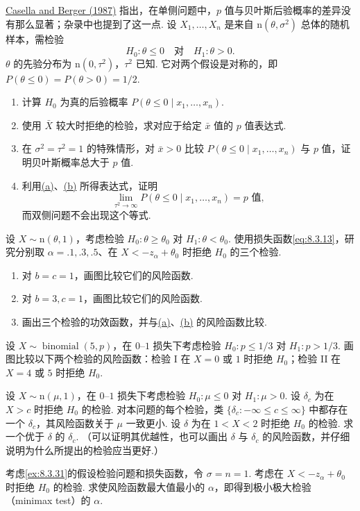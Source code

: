 \begin{exercise}\label{exercise:8.54}
\hyperref[bib:source66]{Casella and Berger (1987)} 指出，在单侧问题中，$p$ 值与贝叶斯后验概率的差异没有那么显著；杂录中也提到了这一点. 设 $X_1,\ldots,X_n$ 是来自 $\mathrm n(\theta,\sigma^2)$ 总体的随机样本，需检验
$$H_0:\theta\le0\quad\text{对}\quad H_1:\theta>0.$$
$\theta$ 的先验分布为 $\mathrm n(0,\tau^2)$，$\tau^2$ 已知. 它对两个假设是对称的，即 $P(\theta\le0)=P(\theta>0)=1/2$.
\begin{enumerate}
\item{}\label{itm:exercise:8.54:a} 计算 $H_0$ 为真的后验概率 $P(\theta\le0\mid x_1,\ldots,x_n)$.
\item{}\label{itm:exercise:8.54:b} 使用 $\bar X$ 较大时拒绝的检验，求对应于给定 $\bar x$ 值的 $p$ 值表达式.
\item 在 $\sigma^2=\tau^2=1$ 的特殊情形，对 $\bar x>0$ 比较 $P(\theta\le0\mid x_1,\ldots,x_n)$ 与 $p$ 值，证明贝叶斯概率总大于 $p$ 值.
\item 利用\hyperref[itm:exercise:8.54:a]{(a)}、\hyperref[itm:exercise:8.54:b]{(b)} 所得表达式，证明
$$\lim_{\tau^2\to\infty}P(\theta\le0\mid x_1,\ldots,x_n)=p\text{ 值},$$
而双侧问题不会出现这个等式.
\end{enumerate}
\end{exercise}
\begin{exercise}\label{exercise:8.55}
设 $X\sim\mathrm n(\theta,1)$，考虑检验 $H_0:\theta\ge\theta_0$ 对 $H_1:\theta<\theta_0$. 使用损失函数\eqref{eq:8.3.13}，研究分别取 $\alpha=.1,.3,.5$、在 $X<-z_\alpha+\theta_0$ 时拒绝 $H_0$ 的三个检验.
\begin{enumerate}
\item{}\label{itm:exercise:8.55:a} 对 $b=c=1$，画图比较它们的风险函数.
\item{}\label{itm:exercise:8.55:b} 对 $b=3,c=1$，画图比较它们的风险函数.
\item 画出三个检验的功效函数，并与\hyperref[itm:exercise:8.55:a]{(a)}、\hyperref[itm:exercise:8.55:b]{(b)} 的风险函数比较.
\end{enumerate}
\end{exercise}
\begin{exercise}\label{exercise:8.56}
设 $X\sim\operatorname{binomial}(5,p)$，在 $0$–$1$ 损失下考虑检验 $H_0:p\le1/3$ 对 $H_1:p>1/3$. 画图比较以下两个检验的风险函数：检验 I 在 $X=0$ 或 $1$ 时拒绝 $H_0$；检验 II 在 $X=4$ 或 $5$ 时拒绝 $H_0$.
\end{exercise}
\begin{exercise}\label{exercise:8.57}
设 $X\sim\mathrm n(\mu,1)$，在 $0$–$1$ 损失下考虑检验 $H_0:\mu\le0$ 对 $H_1:\mu>0$. 设 $\delta_c$ 为在 $X>c$ 时拒绝 $H_0$ 的检验. 对本问题的每个检验，类 $\{\delta_c:-\infty\le c\le\infty\}$ 中都存在一个 $\delta_c$，其风险函数关于 $\mu$ 一致更小. 设 $\delta$ 为在 $1<X<2$ 时拒绝 $H_0$ 的检验. 求一个优于 $\delta$ 的 $\delta_c$. （可以证明其优越性，也可以画出 $\delta$ 与 $\delta_c$ 的风险函数，并仔细说明为什么所提出的检验应当更好.）
\end{exercise}
\begin{exercise}\label{exercise:8.58}
考虑\autoref{ex:8.3.31}的假设检验问题和损失函数，令 $\sigma=n=1$. 考虑在 $X<-z_\alpha+\theta_0$ 时拒绝 $H_0$ 的检验. 求使风险函数最大值最小的 $\alpha$，即得到极小极大检验（minimax test）的 $\alpha$.
\end{exercise}
